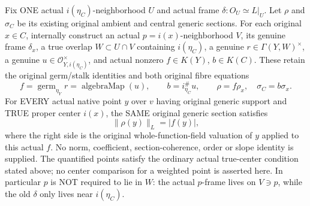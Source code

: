 \begin{theorem}
\label{thm:intrinsic-numerical-original-two-frame-model-norm}
\leanok
{}
Fix ONE actual $i(\eta_C)$-neighborhood $U$ and actual frame
$\delta:O_U\simeq L|_U$. Let $\rho$ and $\sigma_C$ be its existing
original ambient and central generic sections. For each original $x\in C$,
internally construct an actual $p=i(x)$-neighborhood $V$, its genuine
frame $\delta_x$, a true overlap $W\subset U\cap V$ containing $i(\eta_C)$,
a genuine $r\in\Gamma(Y,W)^\times$, a genuine
$u\in\mathcal O_{Y,i(\eta_C)}^\times$, and actual nonzero
$f\in K(Y)$, $b\in K(C)$. These retain the original germ/stalk identities
and both original fibre equations
\[
 f=\operatorname{germ}_{\eta_Y}r=\operatorname{algebraMap}(u),\qquad
 b=i_{\eta_C}^{\#}u,\qquad
 \rho=f\rho_x,\quad\sigma_C=b\sigma_x.
\]
For EVERY actual native point $y$ over $v$ having original generic support
and TRUE proper center $i(x)$, the SAME original generic section satisfies
\[
 \|\rho(y)\|_L=|f(y)|,
\]
where the right side is the original whole-function-field valuation of
$y$ applied to this actual $f$. No norm, coefficient, section-coherence, order or slope identity is
supplied. The quantified points satisfy the ordinary actual true-center
condition stated above; no center comparison for a weighted point is
asserted here. In particular $p$ is NOT
required to lie in $W$: the actual $p$-frame lives on $V\ni p$, while the
old $\delta$ only lives near $i(\eta_C)$.
\end{theorem}
